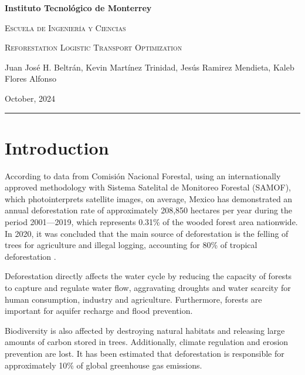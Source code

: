 \documentclass{amsart}
\begin{document}
    \begin{center}
        {\bfseries\LARGE Instituto Tecnológico de Monterrey\par}
        {\scshape\Large Escuela de Ingeniería y Ciencias\par}
        \vspace{0.5cm}
        {\scshape\Huge Reforestation Logistic Transport Optimization\par}
        \vspace{0.5cm}
        {Juan José H. Beltrán, Kevin Martínez Trinidad, Jesús Ramirez Mendieta, Kaleb Flores Alfonso\par}
        \vspace{0.5cm}
        {October, 2024}
        \vspace{0.5cm}
        
        \rule{15.5cm}{0.1pt}
    \end{center}



    \section{Introduction}
    According to data from Comisión Nacional Forestal, using an internationally approved methodology with Sistema Satelital de Monitoreo Forestal (SAMOF), which photointerprets satellite images, on average, Mexico has demonstrated an annual deforestation rate of approximately 208,850 hectares per year during the period 2001—2019, which represents 0.31\% of the wooded forest area nationwide. In 2020, it was concluded that the main source of deforestation is the felling of trees for agriculture and illegal logging, accounting for 80\% of tropical deforestation \parencite{refForestal}.

    Deforestation directly affects the water cycle by reducing the capacity of forests to capture and regulate water flow, aggravating droughts and water scarcity for human consumption, industry and agriculture. Furthermore, forests are important for aquifer recharge and flood prevention.

    Biodiversity is also affected by destroying natural habitats and releasing large amounts of carbon stored in trees. Additionally, climate regulation and erosion prevention are lost. It has been estimated that deforestation is responsible for approximately 10\% of global greenhouse gas emissions.
\end{document}
